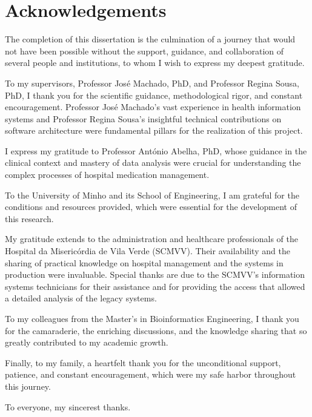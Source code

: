 \chapter*{Acknowledgements}

The completion of this dissertation is the culmination of a journey that would not have been possible without the support, guidance, and collaboration of several people and institutions, to whom I wish to express my deepest gratitude.

To my supervisors, Professor José Machado, PhD, and Professor Regina Sousa, PhD, I thank you for the scientific guidance, methodological rigor, and constant encouragement. Professor José Machado's vast experience in health information systems and Professor Regina Sousa's insightful technical contributions on software architecture were fundamental pillars for the realization of this project.

I express my gratitude to Professor António Abelha, PhD, whose guidance in the clinical context and mastery of data analysis were crucial for understanding the complex processes of hospital medication management.

To the University of Minho and its School of Engineering, I am grateful for the conditions and resources provided, which were essential for the development of this research.

My gratitude extends to the administration and healthcare professionals of the Hospital da Misericórdia de Vila Verde (SCMVV). Their availability and the sharing of practical knowledge on hospital management and the systems in production were invaluable. Special thanks are due to the SCMVV's information systems technicians for their assistance and for providing the access that allowed a detailed analysis of the legacy systems.

To my colleagues from the Master's in Bioinformatics Engineering, I thank you for the camaraderie, the enriching discussions, and the knowledge sharing that so greatly contributed to my academic growth.

Finally, to my family, a heartfelt thank you for the unconditional support, patience, and constant encouragement, which were my safe harbor throughout this journey.

To everyone, my sincerest thanks.

\cleardoublepage 